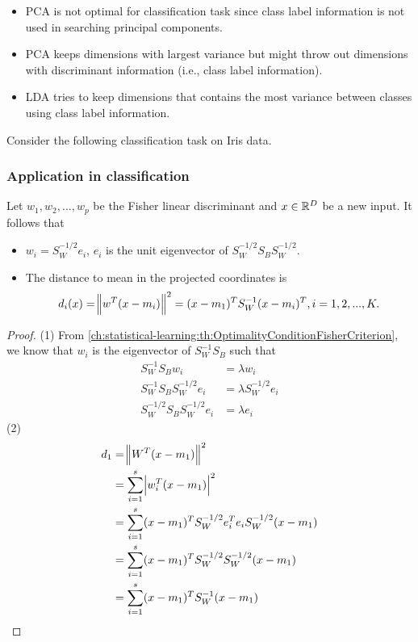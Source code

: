 \begin{refsection}
\begin{remark}
	\begin{itemize}
		\item PCA is not optimal for classification task since class label information is not used in searching principal components.
		\item PCA keeps dimensions with largest variance but might throw out dimensions with discriminant information (i.e., class label information).
		\item LDA tries to keep dimensions that contains the most variance between classes using class label information.
	\end{itemize}	
\end{remark}


\begin{example}
	Consider the following classification task on Iris data. 
	
	
\end{example}

\subsubsection{Application in classification}
\begin{lemma}
	Let $w_1,w_2,...,w_p$ be the Fisher linear discriminant and $x\in\mathbb{R}^D$ be a new input.	It follows that
	\begin{itemize}
		\item $w_i = S_W^{-1/2}e_i$, $e_i$ is the unit eigenvector of $S_W^{-1/2}S_BS_W^{-1/2}$.
		\item  The distance to mean in the projected coordinates is
		$$d_i(x) = \norm{w^T(x - m_i)}^2 = (x-m_1)^TS_W^{-1}(x-m_i)^T, i=1,2,...,K.$$
	\end{itemize}	
\end{lemma}
\begin{proof}
	(1)	From \autoref{ch:statistical-learning:th:OptimalityConditionFisherCriterion}, we know that $w_i$ is the eigenvector of $S_W^{-1}S_B$ such that
	\begin{align*}
	S_W^{-1}S_B w_i &= \lambda w_i \\
	S_W^{-1}S_B S_W^{-1/2}e_i &= \lambda S_W^{-1/2}e_i \\
	S_W^{-1/2}S_B S_W^{-1/2}e_i &= \lambda e_i 
	\end{align*}
	(2) 
	\begin{align*}
	d_1 &= \norm{W^T(x - m_1)}^2 \\
	&= \sum_{i=1}^s \abs{w_i^T(x-m_1)}^2 \\
	&= \sum_{i=1}^s(x-m_1)^TS_W^{-1/2}e^T_ie_iS_W^{-1/2}(x-m_1) \\
	&= \sum_{i=1}^s(x-m_1)^TS_W^{-1/2}S_W^{-1/2}(x-m_1) \\
	&= \sum_{i=1}^s(x-m_1)^TS_W^{-1}(x-m_1) 
	\end{align*}
\end{proof}



\end{refsection}
